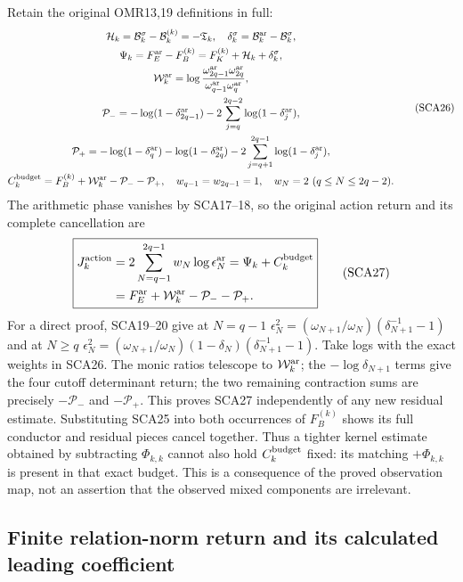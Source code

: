 Retain the original OMR13,19 definitions in full:
\[
 \begin{gathered}
 \mathcal H_k=\mathcal B_k^\sigma-\mathcal B_k^{(k)}=-\mathfrak T_k,
 \quad\delta_k^\sigma=\mathcal B_k^{\rm ar}-\mathcal B_k^\sigma,\\
 \Psi_k=F_E^{\rm ar}-F_B^{(k)}
       =F_K^{(k)}+\mathcal H_k+\delta_k^\sigma,\\
 \mathcal W_k^{\rm ar}
 =\log\frac{\omega_{2q-1}^{\rm ar}\omega_{2q}^{\rm ar}}
                 {\omega_{q-1}^{\rm ar}\omega_q^{\rm ar}},\\
 \mathcal P_-=-\log(1-\delta_{2q-1}^{\rm ar})
      -2\sum_{j=q}^{2q-2}\log(1-\delta_j^{\rm ar}),\\
 \mathcal P_+=-\log(1-\delta_q^{\rm ar})-\log(1-\delta_{2q}^{\rm ar})
      -2\sum_{j=q+1}^{2q-1}\log(1-\delta_j^{\rm ar}),\\
 C_k^{\rm budget}=F_B^{(k)}+\mathcal W_k^{\rm ar}-\mathcal P_--\mathcal P_+,
 \quad w_{q-1}=w_{2q-1}=1,
 \quad w_N=2\ (q\le N\le2q-2).
 \end{gathered}\tag{SCA26}
\]
The arithmetic phase vanishes by SCA17--18, so the original action return
and its complete cancellation are
\[
 \boxed{\begin{aligned}
 J_k^{\rm action}
 &=2\sum_{N=q-1}^{2q-1}w_N\log\epsilon_N^{\rm ar}
   =\Psi_k+C_k^{\rm budget}\\
 &=F_E^{\rm ar}+\mathcal W_k^{\rm ar}-\mathcal P_--\mathcal P_+.
 \end{aligned}}\tag{SCA27}
\]
For a direct proof, SCA19--20 give at $N=q-1$
$\epsilon_N^2=(\omega_{N+1}/\omega_N)(\delta_{N+1}^{-1}-1)$ and at
$N\ge q$
$\epsilon_N^2=(\omega_{N+1}/\omega_N)(1-\delta_N)
(\delta_{N+1}^{-1}-1)$.
Take logs with the exact weights in SCA26. The monic ratios telescope to
$\mathcal W_k^{\rm ar}$; the $-\log\delta_{N+1}$ terms give the four
cutoff determinant return; the two remaining contraction sums are precisely
$-\mathcal P_-$ and $-\mathcal P_+$. This proves SCA27 independently of
any new residual estimate. Substituting SCA25 into both occurrences of
$F_B^{(k)}$ shows its full conductor and residual pieces cancel together.
Thus a tighter kernel estimate obtained by subtracting $\Phi_{k,k}$ cannot
also hold $C_k^{\rm budget}$ fixed: its matching $+\Phi_{k,k}$ is present
in that exact budget. This is a consequence of the proved observation map,
not an assertion that the observed mixed components are irrelevant.

\subsection{Finite relation-norm return and its calculated leading coefficient}

